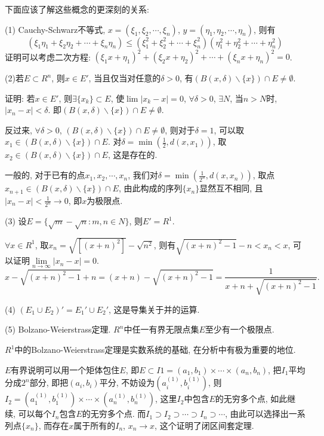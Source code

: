 \documentclass[12pt,a4paper,openany]{book}
\begin{document}
下面应该了解这些概念的更深刻的关系:

(1) Cauchy-Schwarz不等式, $x = (\xi_1, \xi_2, \cdots, \xi_n)$, $y = (\eta_1, \eta_2, \cdots, \eta_n)$, 则有
\[
(\xi_1\eta_1 + \xi_2\eta_2 + \cdots + \xi_n\eta_n) \le (\xi_1^2 + \xi_2^2 + \cdots + \xi_n^2)(\eta_1^2 + \eta_2^2 + \cdots + \eta_n^2)
\]
证明可以考虑二次方程: $(\xi_1x + \eta_1)^2 + (\xi_2x + \eta_2)^2 + \cdots + (\xi_nx + \eta_n)^2 = 0$.

(2)若$E \subset R^n$, 则$x \in E'$, 当且仅当对任意的$\delta > 0$, 有$(B(x, \delta) \backslash \{x\}) \cap E \neq \emptyset$.

证明: 若$x \in E'$, 则$\exists \{x_k\} \subset E$, 使$\lim{|x_k - x|} = 0$, $\forall \delta > 0$, $\exists N$, 当$n > N$时, $|x_n - x| < \delta$. 即$(B(x, \delta) \backslash \{x\}) \cap E \neq \emptyset$.

反过来, $\forall \delta > 0$, $(B(x, \delta) \backslash \{x\}) \cap E \neq \emptyset$, 则对于$\delta = 1$, 可以取$x_1 \in (B(x, \delta) \backslash \{x\}) \cap E$. 对$\delta = \min(\frac{1}{2}, d(x, x_1))$, 取$x_2 \in (B(x, \delta) \backslash \{x\}) \cap E$, 这是存在的.

一般的, 对于已有的点$x_1, x_2, \cdots, x_n$, 我们对$\delta = \min(\frac{1}{2^n}, d(x, x_n))$, 取点$x_{n+1} \in (B(x, \delta) \backslash \{x\}) \cap E$, 由此构成的序列$\{x_n\}$显然互不相同, 且$|x_n - x| < \frac{1}{2^n} \rightarrow 0$, 即$x$为极限点.

(3) 设$E = \{\sqrt{m} - \sqrt{n}: m, n \in N\}$, 则$E' = R^1$.

$\forall x \in R^1$, 取$x_n = \sqrt{[(x + n)^2]} - \sqrt{n^2}$, 则有$\sqrt{(x+n)^2-1} - n < x_n < x$, 可以证明$\lim\limits_{n \rightarrow \infty}{|x_n - x|} = 0$.
\[
x - \sqrt{(x + n)^2 - 1} + n = (x+n) - \sqrt{(x + n)^2 - 1} = \frac{1}{x + n + \sqrt{(x + n)^2 - 1}}.
\]

(4) $(E_1 \cup E_2)' = E_1' \cup E_2'$, 这是导集关于并的运算.

(5) Bolzano-Weierstrass定理. $R^n$中任一有界无限点集$E$至少有一个极限点.

$R^1$中的Bolzano-Weierstrass定理是实数系统的基础, 在分析中有极为重要的地位.

$E$有界说明可以用一个矩体包住$E$, 即$E \subset I1 = (a_1, b_1) \times \cdots \times (a_n, b_n)$, 把$I_1$平均分成$2^n$部分, 即把$(a_i, b_i)$平分, 不妨设为$(a_i^{(1)}, b_i^{(1)})$, 则$I_2 = (a_1^{(1)}, b_1^{(1)}) \times \cdots \times (a_n^{(1)}, b_n^{(1)})$, 这里$I_2$中包含$E$的无穷多个点, 如此继续, 可以每个$I_n$包含$E$的无穷多个点. 而$I_1 \supset I_2 \supset \cdots \supset I_n \supset \cdots$, 由此可以选择出一系列点$\{x_n\}$, 而存在$x$属于所有的$I_n$, $x_n \rightarrow x$, 这个证明了闭区间套定理.
\end{document}
